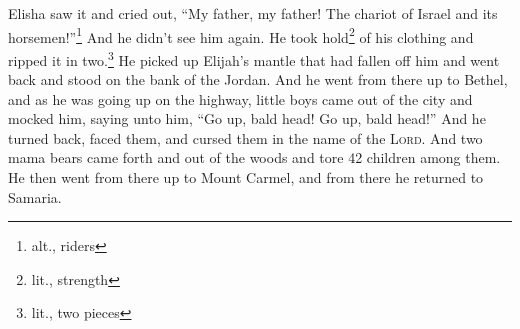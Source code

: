 \begin{inparaenum}
     Elisha saw it and cried out, ``My father, my father! The chariot of Israel and its horsemen!''\footnote{alt., riders} And he didn't see him again. He took hold\footnote{lit., strength} of his clothing and ripped it in two.\footnote{lit., two pieces}%
     He picked up Elijah's mantle that had fallen off him and went back and stood on the bank of the Jordan.%
     And he went from there up to Bethel, and as he was going up on the highway, little boys came out of the city and mocked him, saying unto him, ``Go up, bald head! Go up, bald head!''%
     And he turned back, faced them, and cursed them in the name of the \textsc{Lord}. And two mama bears came forth and out of the woods and tore 42 children among them.%
     He then went from there up to Mount Carmel, and from there he returned to Samaria.%
\end{inparaenum}
